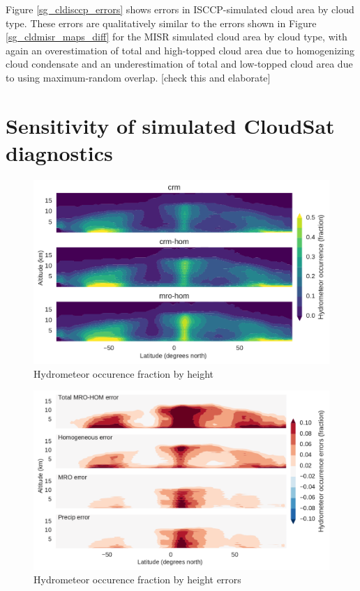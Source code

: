 Figure \ref{sg_cldisccp_errors} shows errors in ISCCP-simulated cloud area by cloud type. These errors are qualitatively similar to the errors shown in Figure \ref{sg_cldmisr_maps_diff} for the MISR simulated cloud area by cloud type, with again an overestimation of total and high-topped cloud area due to homogenizing cloud condensate and an underestimation of total and low-topped cloud area due to using maximum-random overlap. [check this and elaborate]

\section{Sensitivity of simulated CloudSat diagnostics}

\begin{figure}
\centering
\includegraphics[width=\columnwidth]{graphics/hfba_mro-hom.pdf}
\caption{Hydrometeor occurence fraction by height}
\label{sg_hfba_zonal}
\end{figure}

\begin{figure}
\centering
\includegraphics[width=\columnwidth]{graphics/hfba_mro-hom_errors.pdf}
\caption{Hydrometeor occurence fraction by height errors}
\label{sg_hfba_zonal_diff}
\end{figure}

